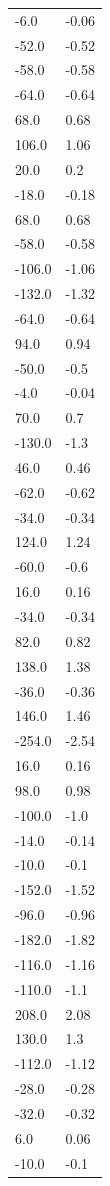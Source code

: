 \begin{longtable}{ll}
-6.0 & -0.06 \\
-52.0 & -0.52 \\
-58.0 & -0.58 \\
-64.0 & -0.64 \\
68.0 & 0.68 \\
106.0 & 1.06 \\
20.0 & 0.2 \\
-18.0 & -0.18 \\
68.0 & 0.68 \\
-58.0 & -0.58 \\
-106.0 & -1.06 \\
-132.0 & -1.32 \\
-64.0 & -0.64 \\
94.0 & 0.94 \\
-50.0 & -0.5 \\
-4.0 & -0.04 \\
70.0 & 0.7 \\
-130.0 & -1.3 \\
46.0 & 0.46 \\
-62.0 & -0.62 \\
-34.0 & -0.34 \\
124.0 & 1.24 \\
-60.0 & -0.6 \\
16.0 & 0.16 \\
-34.0 & -0.34 \\
82.0 & 0.82 \\
138.0 & 1.38 \\
-36.0 & -0.36 \\
146.0 & 1.46 \\
-254.0 & -2.54 \\
16.0 & 0.16 \\
98.0 & 0.98 \\
-100.0 & -1.0 \\
-14.0 & -0.14 \\
-10.0 & -0.1 \\
-152.0 & -1.52 \\
-96.0 & -0.96 \\
-182.0 & -1.82 \\
-116.0 & -1.16 \\
-110.0 & -1.1 \\
208.0 & 2.08 \\
130.0 & 1.3 \\
-112.0 & -1.12 \\
-28.0 & -0.28 \\
-32.0 & -0.32 \\
6.0 & 0.06 \\
-10.0 & -0.1 \\

\end{longtable}
